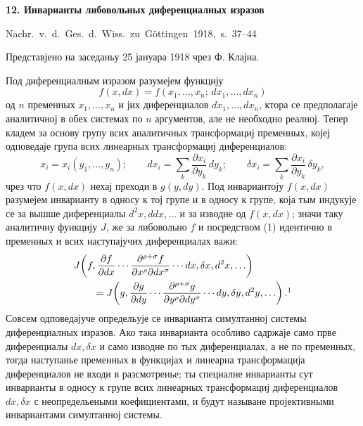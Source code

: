 ﻿\documentclass[11pt]{article}
\begin{document}

\begin{center}
{\Large\bfseries 12. Инварианты либовольных диференциалных изразов}\par
\vspace{1.5em}
\mbox{Nachr. v. d. Ges. d. Wiss. zu Göttingen 1918, s. 37--44}
\end{center}

\vspace{3em}
\begin{center}
Представјено на заседаньу 25 јануара 1918 чрез Ф. Клајна.
\end{center}

Под диференциалным изразом разумејем функцију
\[
f(x,dx)=f(x_1,\ldots,x_n;\,dx_1,\ldots,dx_n)
\]
од \(n\) пременных \(x_1,\ldots,x_n\) и јих диференциалов
\(dx_1,\ldots,dx_n\), ктора се предполагаје аналитичној в обех системах по \(n\) аргументов, але не необходно реалној. Тепер кладем за основу групу всих аналитичных трансформациј пременных, којеј одповедаје група всих линеарных трансформациј диференциалов:
\begin{equation}
x_i=x_i(y_1,\ldots,y_n);\qquad
dx_i=\sum_k\frac{\partial x_i}{\partial y_k}\,dy_k;\qquad
\delta x_i=\sum_k\frac{\partial x_i}{\partial y_k}\,\delta y_k,
\tag{1}
\end{equation}
чрез что \(f(x,dx)\) нехај преходи в \(g(y,dy)\). Под инвариантоју \(f(x,dx)\) разумејем инварианту в односу к тој групе и в односу к групе, која тым индукује се за вышше диференциалы \(d^2x,ddx,\ldots\) и за изводне од \(f(x,dx)\); значи таку аналитичну функцију \(J\), же за либовольно \(f\) и посредством (1) идентично в пременных и всих наступајучих диференциалах важи:
\[
\begin{aligned}
&J\!\left(f,\frac{\partial f}{\partial dx}\cdots
\frac{\partial^{\rho+\sigma}f}{\partial x^\rho\partial dx^\sigma}
\cdots dx,\delta x,d^2x,\ldots\right)\\
&\qquad =
J\!\left(g,\frac{\partial g}{\partial dy}\cdots
\frac{\partial^{\rho+\sigma}g}{\partial y^\rho\partial dy^\sigma}
\cdots dy,\delta y,d^2y,\ldots\right).\footnotemark
\end{aligned}
\]
Совсем одповедајуче определьује се инварианта симултанној системы диференциалных изразов. Ако така инварианта особливо садржаје само прве диференциалы \(dx,\delta x\) и само изводне по тых диференциалах, а не по пременных, тогда наступанье пременных в функцијах и линеарна трансформација диференциалов не входи в разсмотренье; ты специалне инварианты сут инварианты в односу к групе всих линеарных трансформациј диференциалов \(dx,\delta x\) с неопредельеными коефициентами, и будут называне пројективными инвариантами симултанној системы.
\end{document}
